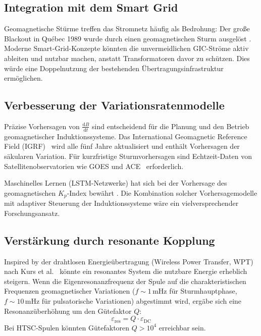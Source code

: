 ﻿\documentclass[a4paper,12pt]{article}
\theoremstyle{definition}
\begin{document}
\subsection{Integration mit dem Smart Grid}

Geomagnetische St\"urme treffen das Stromnetz h\"aufig als Bedrohung:
Der gro{\ss}e Blackout in Qu\'ebec 1989 wurde durch einen
geomagnetischen Sturm ausgel\"ost \cite{bolduc2002gic}. Moderne
Smart-Grid-Konzepte k\"onnten die unvermeidlichen GIC-Str\"ome
aktiv ableiten und nutzbar machen, anstatt Transformatoren davor zu sch\"utzen.
Dies w\"urde eine Doppelnutzung der bestehenden \"Ubertragungsinfrastruktur
erm\"oglichen.

\subsection{Verbesserung der Variationsratenmodelle}

Pr\"azise Vorhersagen von $\tfrac{\mathrm{d}B}{\mathrm{d}t}$ sind
entscheidend f\"ur die Planung und den Betrieb geomagnetischer
Induktionssysteme. Das International Geomagnetic Reference Field (IGRF)~\cite{thebault2015international}
wird alle f\"unf Jahre aktualisiert und enth\"alt Vorhersagen der
s\"akularen Variation. F\"ur kurzfristige Sturmvorhersagen sind
Echtzeit-Daten von Satellitenobservatorien wie GOES und
ACE~\cite{onsager2002operational} erforderlich.

Maschinelles Lernen (LSTM-Netzwerke) hat sich bei der Vorhersage
des geomagne\-tischen $K_p$-Index bew\"ahrt \cite{gruet2018multiple}.
Die Kombination solcher Vorhersagemodelle mit adaptiver Steuerung
der Induktionssysteme w\"are ein vielversprechender Forschungsansatz.

\subsection{Verst\"arkung durch resonante Kopplung}

Inspired by der drahtlosen Energieübertragung (Wireless Power Transfer, WPT)
nach Kurs et al.~\cite{kurs2007wireless} k\"onnte ein resonantes
System die nutzbare Energie erheblich steigern. Wenn die Eigenresonanzfrequenz
der Spule auf die charakteristischen Frequenzen geomagnetischer Variationen
($f \sim 1\,\mathrm{mHz}$ f\"ur Sturmhauptphase, $f \sim 10\,\mathrm{mHz}$
f\"ur pulsatorische Variationen) abgestimmt wird, erg\"abe sich eine
Resonanzüberhöhung um den G\"utefaktor $Q$:
\[
    \varepsilon_{\text{res}} = Q \cdot \varepsilon_{\text{DC}}
\]
Bei HTSC-Spulen k\"onnten G\"utefaktoren $Q > 10^4$ erreichbar sein.
\end{document}
